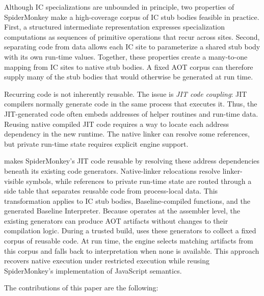 \documentclass[sigplan,screen,review,anonymous]{acmart}
\newcommand{\AM}{\leavevmode{\sc AmberMonkey}}
\begin{document}
Although IC specializations are unbounded in principle, two properties of SpiderMonkey make a high-coverage corpus of IC stub bodies feasible in practice. First, a structured intermediate representation expresses specialization computations as sequences of primitive operations that recur across sites. Second, separating code from data allows each IC site to parameterize a shared stub body with its own run-time values. Together, these properties create a many-to-one mapping from IC sites to native stub bodies. A fixed AOT corpus can therefore supply many of the stub bodies that would otherwise be generated at run time.

Recurring code is not inherently reusable. The issue is {\it JIT code coupling}: JIT compilers normally generate code in the same process that executes it. Thus, the JIT-generated code often embeds addresses of helper routines and run-time data. Reusing native compiled JIT code requires a way to locate each address dependency in the new runtime. The native linker can resolve some references, but private run-time state requires explicit engine support.

\AM{} makes SpiderMonkey's JIT code reusable by resolving these address dependencies beneath its existing code generators. Native-linker relocations resolve linker-visible symbols, while references to private run-time state are routed through a side table that separates reusable code from process-local data. This transformation applies to IC stub bodies, Baseline-compiled functions, and the generated Baseline Interpreter. Because \AM{} operates at the assembler level, the existing generators can produce AOT artifacts without changes to their compilation logic. During a trusted build, \AM{} uses these generators to collect a fixed corpus of reusable code. At run time, the engine selects matching artifacts from this corpus and falls back to interpretation when none is available. This approach recovers native execution under restricted execution while reusing SpiderMonkey's implementation of JavaScript semantics.

The contributions of this paper are the following:
\end{document}
